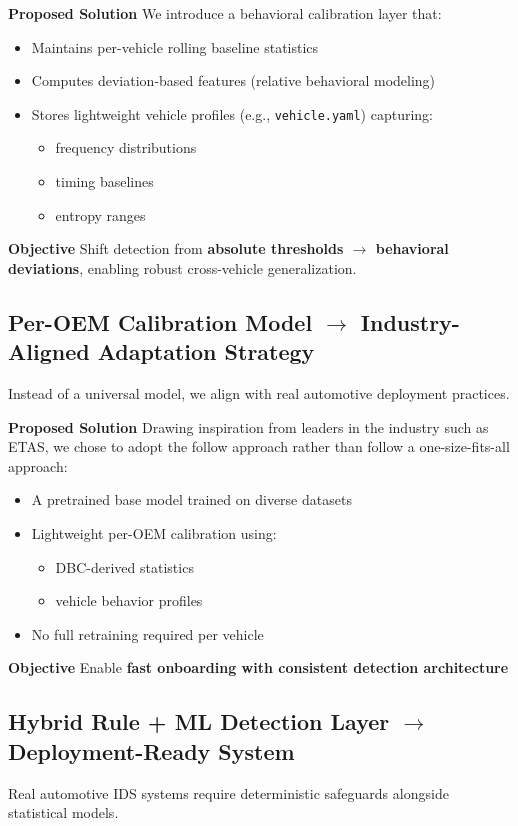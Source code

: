 \documentclass{article}
\begin{document}
\textbf{Proposed Solution}
We introduce a behavioral calibration layer that:
\begin{itemize}[noitemsep]
    \item Maintains per-vehicle rolling baseline statistics
    \item Computes deviation-based features (relative behavioral modeling)
    \item Stores lightweight vehicle profiles (e.g., \texttt{vehicle.yaml}) capturing:
    \begin{itemize}[noitemsep]
        \item frequency distributions
        \item timing baselines
        \item entropy ranges
    \end{itemize}
\end{itemize}

\textbf{Objective}
Shift detection from \textbf{absolute thresholds $\rightarrow$ behavioral deviations}, enabling robust cross-vehicle generalization.

\subsection{Per-OEM Calibration Model $\rightarrow$ Industry-Aligned Adaptation Strategy}
Instead of a universal model, we align with real automotive deployment practices.

\textbf{Proposed Solution}
Drawing inspiration from leaders in the industry such as ETAS, we chose to adopt the follow approach rather than follow a one-size-fits-all approach:
\begin{itemize}[noitemsep]
    \item A pretrained base model trained on diverse datasets
    \item Lightweight per-OEM calibration using:
    \begin{itemize}[noitemsep]
        \item DBC-derived statistics
        \item vehicle behavior profiles
    \end{itemize}
    \item No full retraining required per vehicle
\end{itemize}

\textbf{Objective}
Enable \textbf{fast onboarding with consistent detection architecture}

\subsection{Hybrid Rule + ML Detection Layer $\rightarrow$ Deployment-Ready System}
Real automotive IDS systems require deterministic safeguards alongside statistical models.
\end{document}
